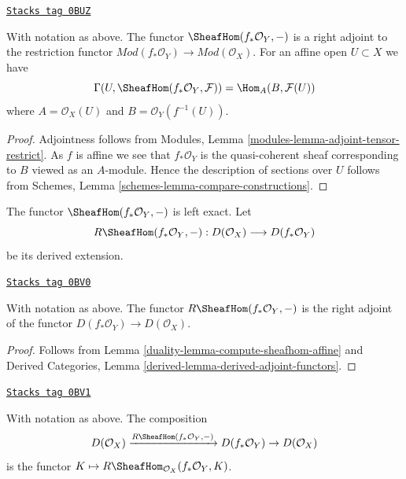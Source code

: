 \begin{lemma}
\label{duality-lemma-compute-sheafhom-affine}
\href{https://stacks.math.columbia.edu/tag/0BUZ}{\texttt{Stacks tag 0BUZ}}

With notation as above. The functor $\SheafHom(f_*\mathcal{O}_Y, -)$ is a
right adjoint to the restriction functor
$\textit{Mod}(f_*\mathcal{O}_Y) \to \textit{Mod}(\mathcal{O}_X)$.
For an affine open $U \subset X$ we have
$$
\Gamma(U, \SheafHom(f_*\mathcal{O}_Y, \mathcal{F})) =
\Hom_A(B, \mathcal{F}(U))
$$
where $A = \mathcal{O}_X(U)$ and $B = \mathcal{O}_Y(f^{-1}(U))$.
\end{lemma}

\begin{proof}
Adjointness follows from
Modules, Lemma \ref{modules-lemma-adjoint-tensor-restrict}.
As $f$ is affine we see that $f_*\mathcal{O}_Y$ is
the quasi-coherent sheaf corresponding to $B$ viewed
as an $A$-module. Hence the description of sections over $U$ follows from
Schemes, Lemma \ref{schemes-lemma-compare-constructions}.
\end{proof}

The functor $\SheafHom(f_*\mathcal{O}_Y, -)$ is left exact. Let
$$
R\SheafHom(f_*\mathcal{O}_Y, -) :
D(\mathcal{O}_X)
\longrightarrow
D(f_*\mathcal{O}_Y)
$$
be its derived extension.

\begin{lemma}
\label{duality-lemma-sheafhom-affine-adjoint}
\href{https://stacks.math.columbia.edu/tag/0BV0}{\texttt{Stacks tag 0BV0}}

With notation as above. The functor $R\SheafHom(f_*\mathcal{O}_Y, -)$
is the right adjoint of the functor $D(f_*\mathcal{O}_Y) \to D(\mathcal{O}_X)$.
\end{lemma}

\begin{proof}

Follows from Lemma \ref{duality-lemma-compute-sheafhom-affine}
and
Derived Categories, Lemma \ref{derived-lemma-derived-adjoint-functors}.
\end{proof}

\begin{lemma}
\label{duality-lemma-sheafhom-affine-ext}
\href{https://stacks.math.columbia.edu/tag/0BV1}{\texttt{Stacks tag 0BV1}}

With notation as above. The composition
$$
D(\mathcal{O}_X) \xrightarrow{R\SheafHom(f_*\mathcal{O}_Y, -)}
D(f_*\mathcal{O}_Y) \to D(\mathcal{O}_X)
$$
is the functor $K \mapsto R\SheafHom_{\mathcal{O}_X}(f_*\mathcal{O}_Y, K)$.
\end{lemma}

